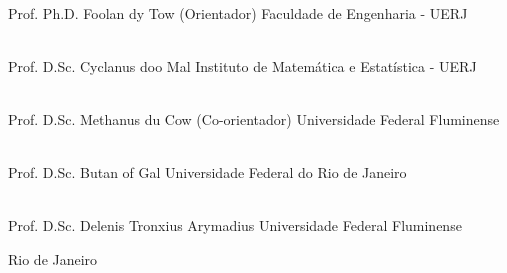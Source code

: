 \begin{flushright}
\parbox{12cm}{

\singlespacing

\hrulefill \\

\vspace{-.4cm}
Prof. Ph.D. Foolan dy Tow (Orientador)
\newline
Faculdade de Engenharia - UERJ
\vspace{.7cm}

\hrulefill \\

\vspace{-.4cm}
Prof. D.Sc. Cyclanus doo Mal
\newline
Instituto de Matem{\'a}tica e Estat{\'i}stica - UERJ
\vspace{.7cm}

\hrulefill \\

\vspace{-.4cm}
Prof. D.Sc. Methanus du Cow (Co-orientador)
\newline
Universidade Federal Fluminense
\vspace{.7cm}

\hrulefill \\

\vspace{-.4cm}
Prof. D.Sc. Butan of Gal
\newline
Universidade Federal do Rio de Janeiro
\vspace{.7cm}

\hrulefill \\

\vspace{-.4cm}
Prof. D.Sc. Delenis Tronxius Arymadius
\newline
Universidade Federal Fluminense
\vspace{.7cm}

}
\end{flushright}
\vfill

\begin{center}
Rio de Janeiro
\end{center}

